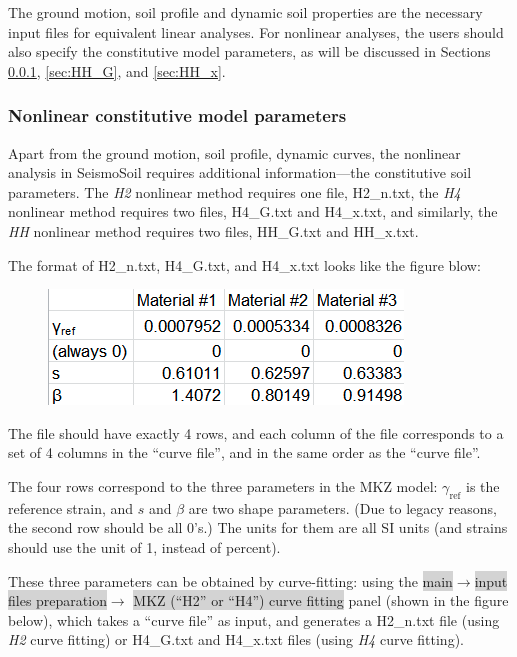 \documentclass[11pt,letterpaper]{article}
\newcommand{\panel}[1]{\colorbox{lightgray}{\textsf{#1}}}
\begin{document}
The ground motion, soil profile and dynamic soil properties are the necessary input files for equivalent linear analyses. For nonlinear analyses, the users should also specify the constitutive model parameters, as will be discussed in Sections \ref{sec:para}, \ref{sec:HH_G}, and \ref{sec:HH_x}.

\subsubsection{Nonlinear constitutive model parameters}\label{sec:para}

Apart from the ground motion, soil profile, dynamic curves, the nonlinear analysis in SeismoSoil requires additional information---the constitutive soil parameters. The \emph{H2} nonlinear method requires one file, \textsf{H2\_n.txt}, the \emph{H4} nonlinear method requires two files, \textsf{H4\_G.txt} and \textsf{H4\_x.txt}, and similarly, the \emph{HH} nonlinear method requires two files, \textsf{HH\_G.txt} and \textsf{HH\_x.txt}.  

The format of \textsf{H2\_n.txt}, \textsf{H4\_G.txt}, and \textsf{H4\_x.txt} looks like the figure blow:

\begin{figure}[H]
\centering
  \includegraphics[width=.52\textwidth]{H2_n_format.png}\\
\end{figure}

The file should have exactly 4 rows, and each column of the file corresponds to a set of 4 columns in the ``curve file'', and in the same order as the ``curve file''.

The four rows correspond to the three parameters in the MKZ model: $\gamma_{\text{ref}}$ is the reference strain, and $s$ and $\beta$ are two shape parameters. (Due to legacy reasons, the second row should be all 0's.) The units for them are all SI units (and strains should use the unit of 1, instead of percent).

These three parameters can be obtained by curve-fitting: using the \panel{main}$\rightarrow$\panel{input files preparation}$\rightarrow$ \panel{MKZ (``H2'' or ``H4'') curve fitting} panel (shown in the figure below), which takes a ``curve file'' as input, and generates a \textsf{H2\_n.txt} file (using \emph{H2} curve fitting) or \textsf{H4\_G.txt} and \textsf{H4\_x.txt} files (using \emph{H4} curve fitting).
\end{document}
